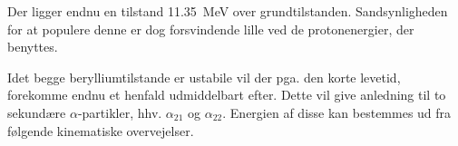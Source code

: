 Der ligger endnu en tilstand \SI{11.35}{\MeV} over grundtilstanden. Sandsynligheden for at populere
denne er dog forsvindende lille ved de protonenergier, der benyttes. 

Idet begge berylliumtilstande er ustabile vil der pga. den korte levetid, forekomme endnu et
henfald udmiddelbart efter. Dette vil give anledning til to sekundære $\alpha$-partikler, hhv.
$\alpha_{21}$ og $\alpha_{22}$. Energien af disse kan bestemmes ud fra følgende kinematiske overvejelser.
